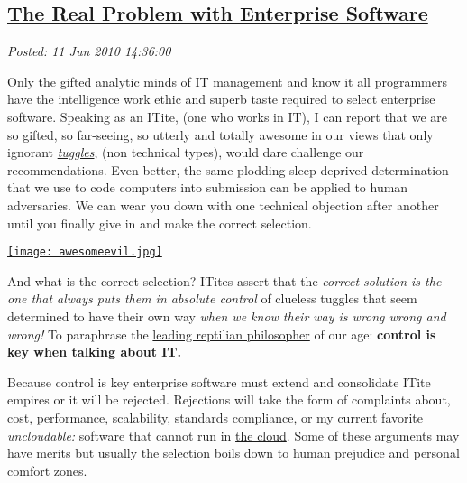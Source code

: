 %

\subsection*{\href{https://bakerjd99.wordpress.com/2010/06/11/the-real-problem-with-enterprise-software/}{The Real Problem with Enterprise Software}}


\noindent\emph{Posted: 11 Jun 2010 14:36:00}
\vspace{6pt}

Only the gifted analytic minds of IT management and know it all
programmers have the intelligence work ethic and superb taste required
to select enterprise software. Speaking as an ITite, (one who works in
IT), I can report that we are so gifted, so far-seeing, so utterly and
totally awesome in our views that only ignorant
\emph{\href{http://www.urbandictionary.com/define.php?term=tuggles}{tuggles}},
(non technical types), would dare challenge our recommendations. Even
better, the same plodding sleep deprived determination that we use to
code computers into submission can be applied to human adversaries. We
can wear you down with one technical objection after another until you
finally give in and make the correct selection.

\captionsetup[floatingfigure]{labelformat=empty}
\begin{floatingfigure}[l]{0.30\textwidth}
\centering
\href{http://online.wsj.com/article/SB10001424052748704025304575285000265955016.html?KEYWORDS=dilbert}{\texttt{[image: awesomeevil.jpg]}}
\label{fig:570X0}
\end{floatingfigure}And what is the correct selection? ITites assert that the \emph{correct
solution is the one that always puts them in absolute control} of
clueless tuggles that seem determined to have their own way \emph{when
we know their way is wrong wrong and wrong!} To paraphrase the
\href{http://www.nytimes.com/2009/02/19/business/media/19adco.html}{leading
reptilian philosopher} of our age: \textbf{control is key when talking
about IT.}

Because control is key enterprise software must extend and consolidate
ITite empires or it will be rejected. Rejections will take the form of
complaints about, cost, performance, scalability, standards compliance,
or my current favorite \emph{uncloudable:} software that cannot run in
\href{http://en.wikipedia.org/wiki/Cloud\_computing}{the cloud}. Some of
these arguments may have merits but usually the selection boils down to
human prejudice and personal comfort zones.

